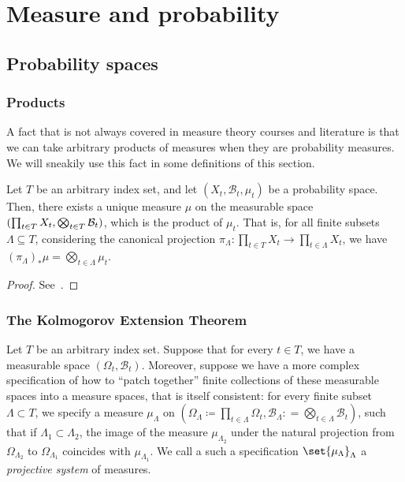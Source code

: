 \documentclass[../main]{subfiles}
\begin{document}
\chapter{Measure and probability}

\section{Probability spaces}

\subsection{Products}
A fact that is not always covered in measure theory courses and literature is that we can take arbitrary products of measures when they are probability measures. We will sneakily use this fact in some definitions of this section.

\begin{theorem}
  Let \(T\) be an arbitrary index set, and let \((X_t,\mathcal{B}_t,\mu_t)\) be a probability space. Then, there exists a unique measure \(\mu\) on the measurable space \((\prod_{t \in T}X_t, \bigotimes_{t \in T}\mathcal{B}_t)\), which is the product of \(\mu_t\). That is, for all finite subsets \(\Lambda \subseteq T\), considering the canonical projection \(\pi_{\Lambda}\colon \prod_{t \in T}X_t \to \prod_{t \in \Lambda}X_t\), we have \((\pi_{\Lambda})_*\mu = \bigotimes_{t \in \Lambda}\mu_t\).
\end{theorem}

\begin{proof}
  See~\cite[Section 3.5]{bogachevMeasureTheory2007}.
\end{proof}

\subsection{The Kolmogorov Extension Theorem}

Let \(T\) be an arbitrary index set. Suppose that for every \(t \in T\), we have a measurable space \((\Omega_t, \mathcal{B}_t)\). Moreover, suppose we have a more complex specification of how to ``patch together'' finite collections of these measurable spaces into a measure spaces, that is itself consistent: for every finite subset \(\Lambda \subset T\), we specify a measure \(\mu_{\Lambda}\) on \((\Omega_{\Lambda} \coloneqq \prod_{t \in \Lambda}\Omega_t
, \mathcal{B}_{\Lambda} \colon= \bigotimes_{t \in \Lambda} \mathcal{B}_t)\), such that if \(\Lambda_1 \subset \Lambda_2\), the image of the measure \(\mu_{\Lambda_2}\) under the natural projection from \(\Omega_{\Lambda_2}\) to \(\Omega_{\Lambda_1}\) coincides with \(\mu_{\Lambda_1}\). We call a such a specification \(\set{\mu_{\Lambda}}_{\Lambda}\) a \emph{projective system} of measures.
\end{document}
